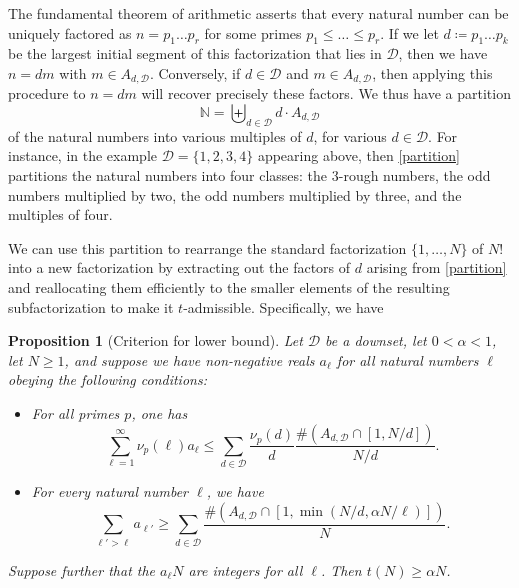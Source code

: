 \documentclass[10pt,a4paper,reqno]{amsart}
\numberwithin{equation}{section}
\theoremstyle{plain}
\newtheorem{proposition}[proposition]{Proposition}
\theoremstyle{definition}
\newcommand\N{\mathbb{N}}
\begin{document}
The fundamental theorem of arithmetic asserts that every natural number can be uniquely factored as $n = p_1 \dots p_r$ for some primes $p_1 \leq \dots \leq p_r$.  If we let $d \coloneqq p_1 \dots p_k$ be the largest initial segment of this factorization that lies in ${\mathcal D}$, then we have $n=dm$ with $m \in A_{d,{\mathcal D}}$.  Conversely, if $d \in {\mathcal D}$ and $m \in A_{d,{\mathcal D}}$, then applying this procedure to $n=dm$ will recover precisely these factors.  We thus have a partition
\begin{equation}\label{partition}
 \N = \biguplus_{d \in {\mathcal D}} d \cdot A_{d,{\mathcal D}}
\end{equation}
of the natural numbers into various multiples of $d$, for various $d \in {\mathcal D}$.  For instance, in the example ${\mathcal D} = \{1,2,3,4\}$ appearing above, then \eqref{partition} partitions the natural numbers into four classes: the $3$-rough numbers, the odd numbers multiplied by two, the odd numbers multiplied by three, and the multiples of four.

We can use this partition to rearrange the standard factorization $\{1,\dots,N\}$ of $N!$ into a new factorization by extracting out the factors of $d$ arising from \eqref{partition} and reallocating them efficiently to the smaller elements of the resulting subfactorization to make it $t$-admissible.  Specifically, we have

\begin{proposition}[Criterion for lower bound]\label{rearrange-crit}  Let ${\mathcal D}$ be a downset, let $0 < \alpha < 1$, let $N \geq 1$, and suppose we have non-negative reals $a_\ell$ for all natural numbers $\ell$ obeying the following conditions:
  \begin{itemize}
  \item[(i)]  For all primes $p$, one has
  \begin{equation}\label{i-eq-1}
     \sum_{\ell=1}^\infty \nu_p(\ell) a_\ell  \leq \sum_{d \in {\mathcal D}} \frac{\nu_p(d)}{d} \frac{\# (A_{d,{\mathcal D}} \cap [1,N/d])}{N/d}.
  \end{equation}
  \item[(ii)]  For every natural number $\ell$, we have
  \begin{equation}\label{l-eq-1} \sum_{\ell' > \ell} a_{\ell'} \geq \sum_{d \in {\mathcal D}} \frac{\# (A_{d,{\mathcal D}} \cap [1,\min(N/d, \alpha N/\ell)])}{N}.
  \end{equation}
  \end{itemize}
  Suppose further that the $a_\ell N$ are integers for all $\ell$.   Then $t(N) \geq \alpha N$.
  \end{proposition}
\end{document}
